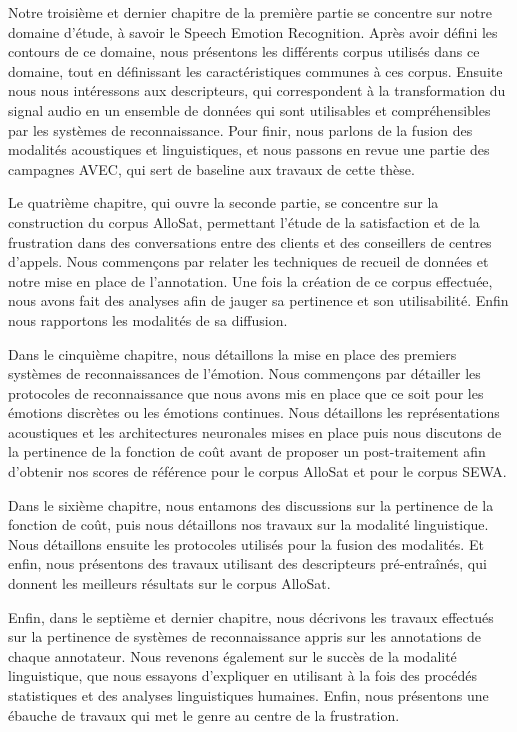 Notre troisième et dernier chapitre de la première partie se concentre sur notre domaine d'étude, à savoir le Speech Emotion Recognition. Après avoir défini les contours de ce domaine, nous présentons les différents corpus utilisés dans ce domaine, tout en définissant les caractéristiques communes à ces corpus. Ensuite nous nous intéressons aux descripteurs, qui correspondent à la transformation du signal audio en un ensemble de données qui sont utilisables et compréhensibles par les systèmes de reconnaissance. Pour finir, nous parlons de la fusion des modalités acoustiques et linguistiques, et nous passons en revue une partie des campagnes AVEC, qui sert de baseline aux travaux de cette thèse.

Le quatrième chapitre, qui ouvre la seconde partie, se concentre sur la construction du corpus AlloSat, permettant l'étude de la satisfaction et de la frustration dans des conversations entre des clients et des conseillers de centres d'appels. Nous commençons par relater les techniques de recueil de données et notre mise en place de l'annotation. Une fois la création de ce corpus effectuée, nous avons fait des analyses afin de jauger sa pertinence et son utilisabilité. Enfin nous rapportons les modalités de sa diffusion.

Dans le cinquième chapitre, nous détaillons la mise en place des premiers systèmes de reconnaissances de l'émotion. Nous commençons par détailler les protocoles de reconnaissance que nous avons mis en place que ce soit pour les émotions discrètes ou les émotions continues. Nous détaillons les représentations acoustiques et les architectures neuronales mises en place puis nous discutons de la pertinence de la fonction de coût avant de proposer un post-traitement afin d'obtenir nos scores de référence pour le corpus AlloSat et pour le corpus SEWA.

Dans le sixième chapitre, nous entamons des discussions sur la pertinence de la fonction de coût, puis nous détaillons nos travaux sur la modalité linguistique. Nous détaillons ensuite les protocoles utilisés pour la fusion des modalités. Et enfin, nous présentons des travaux utilisant des descripteurs pré-entraînés, qui donnent les meilleurs résultats sur le corpus AlloSat.

Enfin, dans le septième et dernier chapitre, nous décrivons les travaux effectués sur la pertinence de systèmes de reconnaissance appris sur les annotations de chaque annotateur. Nous revenons également sur le succès de la modalité linguistique, que nous essayons d'expliquer en utilisant à la fois des procédés statistiques et des analyses linguistiques humaines. Enfin, nous présentons une ébauche de travaux qui met le genre au centre de la frustration.
